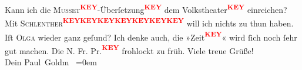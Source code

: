 \begin{ledgroupsized}[t]{13cm}
           \pstart
           Kann ich die \textsc{Musset\textcolor{red}{\textsuperscript{\textbf{KEY}}}}-Überſetzung\textcolor{red}{\textsuperscript{\textbf{KEY}}} dem Volkstheater\textcolor{red}{\textsuperscript{\textbf{KEY}}} einreichen? Mit \textsc{Schlenther\textcolor{red}{\textsuperscript{\textbf{KEY}}}\textcolor{red}{\textsuperscript{\textbf{KEY}}}\textcolor{red}{\textsuperscript{\textbf{KEY}}}\textcolor{red}{\textsuperscript{\textbf{KEY}}}\textcolor{red}{\textsuperscript{\textbf{KEY}}}\textcolor{red}{\textsuperscript{\textbf{KEY}}}}\textcolor{red}{\textsuperscript{\textbf{KEY}}} will ich nichts zu thun haben. \pend
           \pstart
           Iſt \textsc{Olga} wieder ganz geſund? \pend
           \pstart
           Ich denke auch, die »Zeit\textcolor{red}{\textsuperscript{\textbf{KEY}}}« wird ſich noch ſehr
                    gut machen. Die N. Fr. Pr.\textcolor{red}{\textsuperscript{\textbf{KEY}}} frohlockt zu früh. Viele
                    treue Grüße! {\\[\baselineskip]}Dein \spacefill\mbox{Paul Goldm }\pend
           \leftskip=0em{}
         
         \endnumbering{}\end{ledgroupsized}\begin{anhang}\end{anhang}\newcommand{\dateiname}{L03225}\newcommand{\titel}{Paul Goldmann an Arthur Schnitzler, 6. 10. [1902]}\newcommand{\editorInnen}{Martin Anton Müller und Laura Untner}
      